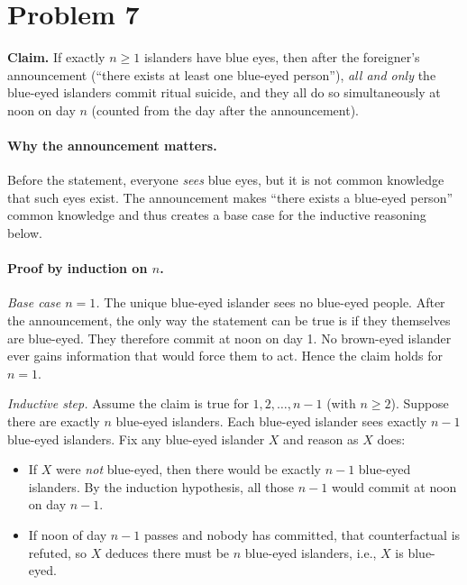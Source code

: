 
\section*{Problem 7}
\textbf{Claim.} If exactly $n\ge 1$ islanders have blue eyes, then after the foreigner's announcement
(``there exists at least one blue-eyed person''), \emph{all and only} the blue-eyed islanders
commit ritual suicide, and they all do so simultaneously at noon on day $n$ (counted from the day after the announcement).

\paragraph{Why the announcement matters.}
Before the statement, everyone \emph{sees} blue eyes, but it is not common knowledge that such eyes exist.
The announcement makes ``there exists a blue-eyed person'' common knowledge and thus creates a base case
for the inductive reasoning below.

\paragraph{Proof by induction on $n$.}

\emph{Base case $n=1$.}
The unique blue-eyed islander sees no blue-eyed people. After the announcement, the only way
the statement can be true is if they themselves are blue-eyed. They therefore commit at noon on day 1.
No brown-eyed islander ever gains information that would force them to act. Hence the claim holds for $n=1$.

\emph{Inductive step.}
Assume the claim is true for $1,2,\dots,n-1$ (with $n\ge 2$).
Suppose there are exactly $n$ blue-eyed islanders.
Each blue-eyed islander sees exactly $n-1$ blue-eyed islanders.
Fix any blue-eyed islander $X$ and reason as $X$ does:

\begin{itemize}
\item If $X$ were \emph{not} blue-eyed, then there would be exactly $n-1$ blue-eyed islanders.
  By the induction hypothesis, all those $n-1$ would commit at noon on day $n-1$.
\item If noon of day $n-1$ passes and nobody has committed, that counterfactual is refuted,
  so $X$ deduces there must be $n$ blue-eyed islanders, i.e., $X$ is blue-eyed.
\end{itemize}

